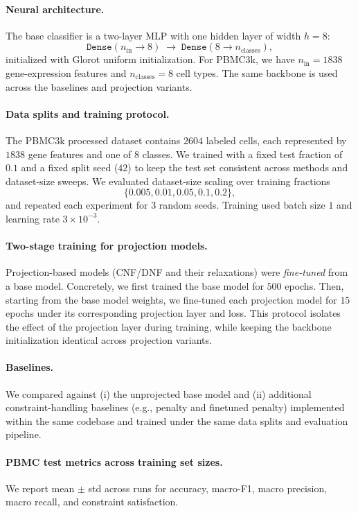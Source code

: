 \documentclass{article}
\theoremstyle{plain}
\theoremstyle{definition}
\theoremstyle{remark}
\begin{document}
\paragraph{Neural architecture.}
The base classifier is a two-layer MLP with one hidden layer of width $h=8$:
\[
\texttt{Dense}(n_{\text{in}} \rightarrow 8) \;\rightarrow\; \texttt{Dense}(8 \rightarrow n_{\text{classes}}),
\]
initialized with Glorot uniform initialization. For PBMC3k, we have $n_{\text{in}}=1838$ gene-expression features and $n_{\text{classes}}=8$ cell types. The same backbone is used across the baselines and projection variants.

\paragraph{Data splits and training protocol.}
The PBMC3k processed dataset contains $2604$ labeled cells, each represented by $1838$ gene features and one of $8$ classes. We trained with a fixed test fraction of $0.1$ and a fixed split seed ($42$) to keep the test set consistent across methods and dataset-size sweeps. We evaluated dataset-size scaling over training fractions
\[
\{0.005, 0.01, 0.05, 0.1, 0.2\},
\]
and repeated each experiment for $3$ random seeds. Training used batch size $1$ and learning rate $3\times 10^{-3}$.


\paragraph{Two-stage training for projection models.}
Projection-based models (CNF/DNF and their relaxations) were \emph{fine-tuned} from a base model. Concretely, we first trained the base model for $500$ epochs. Then, starting from the base model weights, we fine-tuned each projection model for $15$ epochs under its corresponding projection layer and loss. This protocol isolates the effect of the projection layer during training, while keeping the backbone initialization identical across projection variants.

\paragraph{Baselines.}
We compared against (i) the unprojected base model and (ii) additional constraint-handling baselines (e.g., penalty and finetuned penalty) implemented within the same codebase and trained under the same data splits and evaluation pipeline.

\paragraph{PBMC test metrics across training set sizes.}
We report mean $\pm$ std across runs for accuracy, macro-F1, macro precision, macro recall, and constraint satisfaction.
\end{document}
